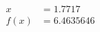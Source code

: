 \documentclass[preview]{standalone}
\begin{document}
\begin{align*}
x &= 1.7717\\f(x) &= 6.4635646
\end{align*}
\end{document}
